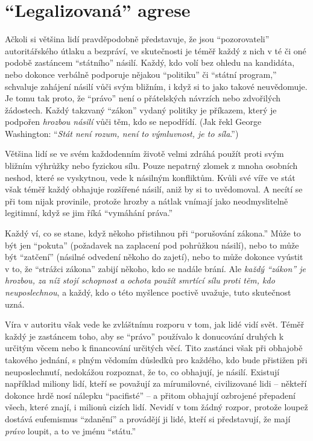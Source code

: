 \documentclass{book}
\begin{document}
\section{\enquote{Legalizovaná} agrese}

Ačkoli si většina lidí pravděpodobně představuje, že jsou \enquote{pozorovateli} autoritářského útlaku a bezpráví, ve skutečnosti je téměř každý z nich v té či oné podobě zastáncem \enquote{státního} násilí. Každý, kdo volí bez ohledu na kandidáta, nebo dokonce verbálně podporuje nějakou \enquote{politiku} či \enquote{státní program,} schvaluje zahájení násilí vůči svým bližním, i když si to jako takové neuvědomuje. Je tomu tak proto, že \enquote{právo} není o přátelských návrzích nebo zdvořilých žádostech. Každý takzvaný \enquote{zákon} vydaný politiky je příkazem, který je podpořen \emph{hrozbou násilí} vůči těm, kdo se nepodřídí. (Jak řekl George Washington: \enquote{\emph{Stát není rozum, není to výmluvnost, je to síla}.})

Většina lidí se ve svém každodenním životě velmi zdráhá použít proti svým bližním výhrůžky nebo fyzickou sílu. Pouze nepatrný zlomek z mnoha osobních neshod, které se vyskytnou, vede k násilným konfliktům. Kvůli své víře ve stát však téměř každý obhajuje rozšířené násilí, aniž by si to uvědomoval. A necítí se při tom nijak provinile, protože hrozby a nátlak vnímají jako neodmyslitelně legitimní, když se jim říká \enquote{vymáhání práva.}

Každý ví, co se stane, když někoho přistihnou při \enquote{porušování zákona.} Může to být jen \enquote{pokuta} (požadavek na zaplacení pod pohrůžkou násilí), nebo to může být \enquote{zatčení} (násilné odvedení někoho do zajetí), nebo to může dokonce vyústit v to, že \enquote{strážci zákona} zabijí někoho, kdo se nadále brání. Ale \emph{každý \enquote{zákon} je hrozbou, za níž stojí schopnost a ochota použít smrtící sílu proti těm, kdo neuposlechnou}, a každý, kdo o této myšlence poctivě uvažuje, tuto skutečnost uzná.

Víra v autoritu však vede ke zvláštnímu rozporu v tom, jak lidé vidí svět. Téměř každý je zastáncem toho, aby se \enquote{právo} používalo k donucování druhých k určitým věcem nebo k financování určitých věcí. Tito zastánci však při obhajobě takového jednání, s plným vědomím důsledků pro každého, kdo bude přistižen při neuposlechnutí, nedokážou rozpoznat, že to, co obhajují, je násilí. Existují například miliony lidí, kteří se považují za mírumilovné, civilizované lidi -- někteří dokonce hrdě nosí nálepku \enquote{pacifisté} -- a přitom obhajují ozbrojené přepadení všech, které znají, i milionů cizích lidí. Nevidí v tom žádný rozpor, protože loupež dostává eufemismus \enquote{zdanění} a provádějí ji lidé, kteří si představují, že mají \emph{právo} loupit, a to ve jménu \enquote{státu.}
\end{document}
